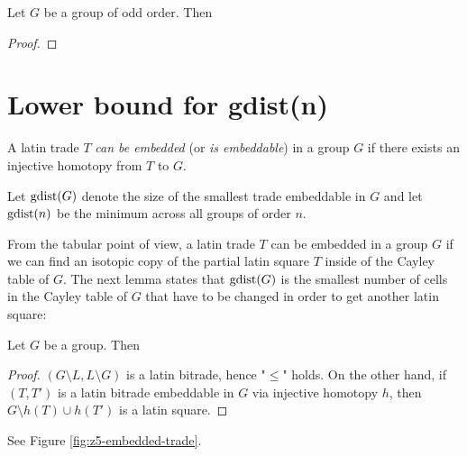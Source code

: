 \begin{lem}
\label{lem:zG-is-zp}
Let $G$ be a group of odd order. Then
%
\end{lem}
\begin{proof}
\end{proof}

\section{Lower bound for gdist(n)}

\begin{defn}
A latin trade $T$ \emph{can be embedded} (or \emph{is embeddable}) in a group $G$ if there exists an injective homotopy from $T$ to $G$.

Let \emph{$\mathop{\mathrm{gdist}}(G)$} denote the size of the smallest trade embeddable in $G$ and let \emph{$\mathop{\mathrm{gdist}}(n)$} be the minimum across all groups of order $n$.
\end{defn}

From the tabular point of view, a latin trade $T$ can be embedded in a group $G$ if we can find an isotopic copy of the partial latin square $T$ inside of the Cayley table of $G$. The next lemma states that $\mathop{\mathrm{gdist}}(G)$ is the smallest number of cells in the Cayley table of $G$ that have to be changed in order to get another latin square:

\begin{lem}
Let $G$ be a group. Then
%
\end{lem}
\begin{proof}
$(G \setminus L, L \setminus G)$ is a latin bitrade, hence "$\leq$" holds. On the other hand, if $(T,T')$ is a latin bitrade embeddable in $G$ via injective homotopy $h$, then $G \setminus h(T) \cup h(T')$ is a latin square.
\end{proof}

\begin{exmp}
See Figure \ref{fig:z5-embedded-trade}.
\end{exmp}%

